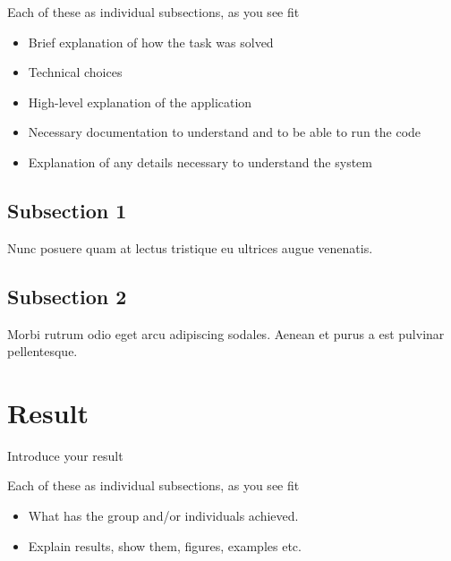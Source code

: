 Each of these as individual subsections, as you see fit\\
\begin{itemize}
    \item Brief explanation of how the task was solved
    \item Technical choices
    \item High-level explanation of the application
    \item Necessary documentation to understand and to be able to run the code
    \item Explanation of any details necessary to understand the system
\end{itemize}

\subsection{Subsection 1}

Nunc posuere quam at lectus tristique eu ultrices augue venenatis. 


\subsection{Subsection 2}
Morbi rutrum odio eget arcu adipiscing sodales. Aenean et purus a est pulvinar pellentesque. 


\section{Result}

Introduce your result

Each of these as individual subsections, as you see fit\\
\begin{itemize}
    \item What has the group and/or individuals achieved.
    \item Explain results, show them, figures, examples etc.
\end{itemize}

